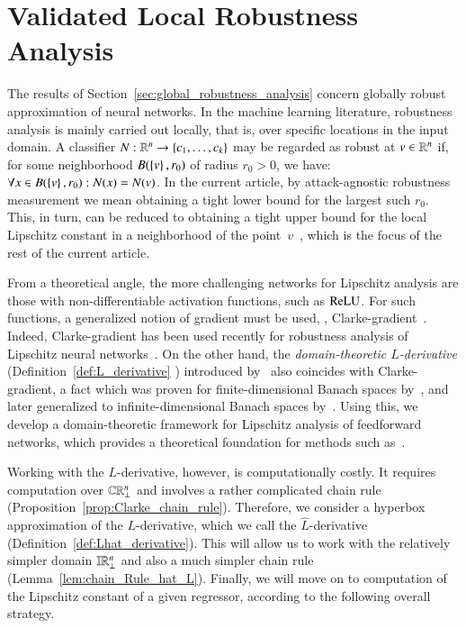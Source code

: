 \documentclass[11pt,times]{article}
\begin{document}
  \section{Validated Local Robustness Analysis}
\label{sec:validated_lipschitz_constant}




The results of Section~\ref{sec:global_robustness_analysis} concern
globally robust approximation of neural networks. In the machine
learning literature, robustness analysis is mainly carried out
locally, that is, over specific locations in the input domain. A
classifier $N: \R^n \to \set{c_1, \ldots, c_k}$ may be regarded as
robust at $v \in \R^n$ if, for some neighborhood $B( \set{v}, r_0)$ of
radius $r_0 > 0$, we have:
$\forall x \in B(\set{v},r_0): N(x) = N(v)$. In the current article,
by attack-agnostic robustness measurement we mean obtaining a tight
lower bound for the largest such $r_0$. This, in turn, can be reduced
to obtaining a tight upper bound for the local Lipschitz constant in a
neighborhood of the
point~$v$~\parencite{Hein_Andriushchenko:Robustness:2017,Weng_et_al-CLEVER-ICLR:2018},
which is the focus of the rest of the current article.



From a theoretical angle, the more challenging networks for Lipschitz
analysis are those with non-differentiable activation functions, such
as $\ReLU$. For such functions, a generalized notion of gradient must
be used, {\eg},
Clarke-gradient~\parencite{Clarke:Opt_Non_Smooth_Analysis-Book:1990}. Indeed,
Clarke-gradient has been used recently for robustness analysis of
Lipschitz neural
networks~\parencite{Jordan_Dimakis:Exactly_NeurIPS:2020,Jordan_Dimakis:Provable_ICML:2021}. On
the other hand, the \emph{domain-theoretic $L$-derivative}
(Definition~\ref{def:L_derivative} )
introduced by~\textcite{Edalat:2008:Continuous_Derivative} also
coincides with Clarke-gradient, a fact which was proven for
finite-dimensional Banach spaces
by~\textcite{Edalat:2008:Continuous_Derivative}, and later generalized
to infinite-dimensional Banach spaces
by~\textcite{Hertling:Clarke_Edalat:2017}. Using this, we develop a
domain-theoretic framework for Lipschitz analysis of feedforward
networks, which provides a theoretical foundation for methods such
as~\parencite{Jordan_Dimakis:Exactly_NeurIPS:2020,Jordan_Dimakis:Provable_ICML:2021}. 



Working with the $L$-derivative, however, is computationally
costly. It requires computation over $\cCPPO{\R^n\lift}$ and involves
a rather complicated chain rule
(Proposition~\ref{prop:Clarke_chain_rule}). Therefore, we consider a
hyperbox approximation of the $L$-derivative, which we call the
$\hat{L}$-derivative (Definition~\ref{def:Lhat_derivative}). This will
allow us to work with the relatively simpler domain
$\intvaldom[\R^n\lift]$ and also a much simpler chain rule
(Lemma~\ref{lem:chain_Rule_hat_L}). Finally, we will move on to
computation of the Lipschitz constant of a given regressor, according
to the following overall strategy.
\end{document}
